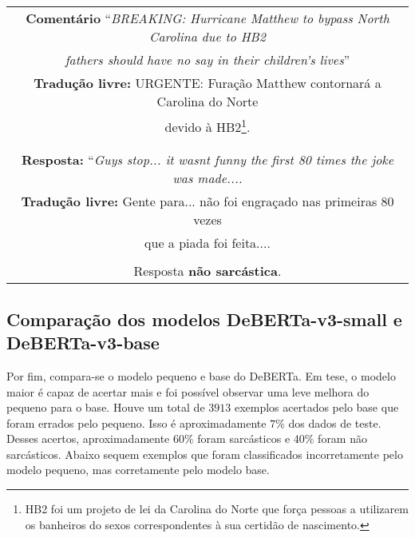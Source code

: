 \begin{center}
\begin{tabular}{|c|}

\hline

\textbf{Comentário} ``\textit{BREAKING: Hurricane Matthew to bypass North Carolina due to HB2} \\
\textit{fathers should have no say in their children's lives}'' \\

\textbf{Tradução livre:} URGENTE: Furação Matthew contornará a Carolina do Norte \\
devido à HB2\footnote{HB2 foi um projeto de lei da Carolina do Norte que força
pessoas a utilizarem os banheiros do sexos correspondentes à sua certidão de
nascimento.}. \\ \\

\hline

\\

\textbf{Resposta:} ``\textit{Guys stop... it wasnt funny the first 80 times the
joke was made....} \\

\textbf{Tradução livre:} Gente para... não foi engraçado nas primeiras 80 vezes
\\
que a piada foi feita.... \\ \\

Resposta \textbf{não sarcástica}.

\\ \hline

\end{tabular}
\end{center}

\subsection{Comparação dos modelos DeBERTa-v3-small e DeBERTa-v3-base}%
\label{sub:comparacao_dos_modelos_deberta-v3-small_e-deberta-v3-base}

Por fim, compara-se o modelo pequeno e base do DeBERTa. Em tese, o
modelo maior é capaz de acertar mais e foi possível observar uma leve melhora do
pequeno para o base. Houve um total de $3913$ exemplos acertados pelo base que
foram errados pelo pequeno. Isso é aproximadamente $7\%$ dos dados de teste.
Desses acertos, aproximadamente $60\%$ foram sarcásticos e $40\%$ foram não
sarcásticos. Abaixo sequem exemplos que foram classificados incorretamente pelo
modelo pequeno, mas corretamente pelo modelo base.

